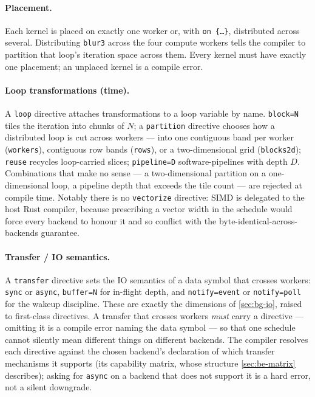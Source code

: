 \paragraph{Placement.} Each kernel is placed on exactly one worker or, with
\texttt{on \{\dots\}}, distributed across several. Distributing \texttt{blur3}
across the four compute workers tells the compiler to partition that loop's
iteration space across them. Every kernel must have exactly one placement; an
unplaced kernel is a compile error.

\paragraph{Loop transformations (time).} A \texttt{loop} directive attaches
transformations to a loop variable by name. \texttt{block=N} tiles the iteration
into chunks of $N$; a \texttt{partition} directive chooses how a distributed loop is
cut across workers --- into one contiguous band per worker (\texttt{workers}),
contiguous row bands (\texttt{rows}), or a two-dimensional grid (\texttt{blocks2d});
\texttt{reuse} recycles loop-carried slices; \texttt{pipeline=D} software-pipelines
with depth $D$.
Combinations that make no sense --- a two-dimensional partition on a
one-dimensional loop, a pipeline depth that exceeds the tile count --- are
rejected at compile time. Notably there is no \texttt{vectorize} directive: SIMD
is delegated to the host Rust compiler, because prescribing a vector width in the
schedule would force every backend to honour it and so conflict with the
byte-identical-across-backends guarantee.

\paragraph{Transfer / IO semantics.} A \texttt{transfer} directive sets the IO
semantics of a data symbol that crosses workers: \texttt{sync} or \texttt{async},
\texttt{buffer=N} for in-flight depth, and \texttt{notify=event} or
\texttt{notify=poll} for the wakeup discipline. These are exactly the dimensions
of \cref{sec:bg-io}, raised to first-class directives. A transfer that crosses
workers \emph{must} carry a directive --- omitting it is a compile error naming
the data symbol --- so that one schedule cannot silently mean different things on
different backends. The compiler resolves each directive against the chosen
backend's declaration of which transfer mechanisms it supports (its capability
matrix, whose structure \cref{sec:be-matrix} describes); asking for \texttt{async}
on a backend that does not support it is a hard error, not a silent downgrade.

